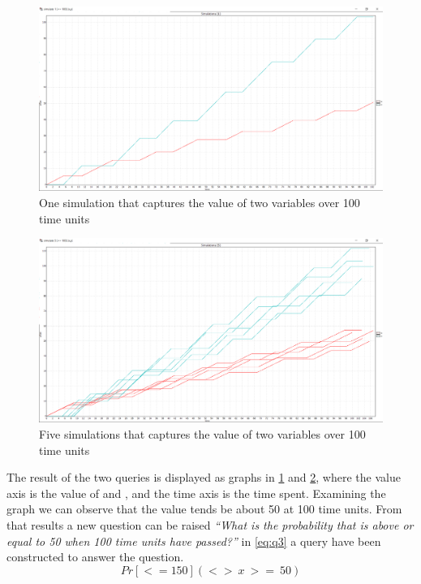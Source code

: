 \begin{figure}[!h]
	\includegraphics[width=\textwidth]{graphics/showcase01.png}
	\caption{One simulation that captures the value of two variables  over 100 time units}
	\label{fig:sim01}
\end{figure}

\begin{figure}[!h]
	\includegraphics[width=\textwidth]{graphics/showcase02.png}
	\caption{Five simulations that captures the value of two variables  over 100 time units}
	\label{fig:sim02}
\end{figure}

The result of the two queries is displayed as graphs in \cref{fig:sim01} and \cref{fig:sim02}, where the value axis is the value of  and , and the time axis is the time spent.
Examining the graph we can observe that the value  tends be about 50 at 100 time units.
From that results a new question can be raised \textit{``What is the probability that  is above or equal to 50 when 100 time units have passed?''} in \cref{eq:q3} a query have been constructed to answer the question.
\begin{equation}\label{eq:q3}
Pr[<=150](<>\ x\ >=\ 50)
\end{equation}

